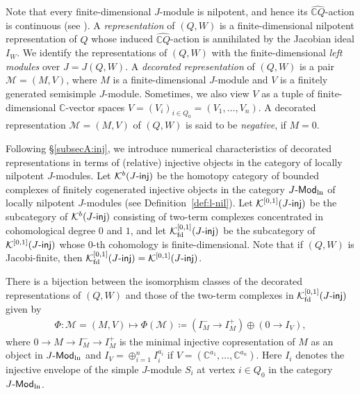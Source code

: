 \documentclass[12pt]{amsart}
\theoremstyle{definition}
\theoremstyle{remark}
\numberwithin{equation}{section}
\newcommand{\Modln}{\mathchar`-\mathsf{Mod}_{\mathrm{ln}}}
\begin{document}
Note that every finite-dimensional $J$-module is
nilpotent, and hence its $\widehat{\mathbb CQ}$-action is continuous
(see \cite[\S 10]{DWZ08}).
A {\em representation} of $(Q,W)$ is a finite-dimensional nilpotent representation of $Q$ whose induced $\widehat{\mathbb CQ}$-action is annihilated by the Jacobian ideal $I_W$. We identify the representations of $(Q,W)$ with the finite-dimensional {\em left modules} over $J=J(Q,W)$. 
A {\em decorated representation}
of $(Q,W)$ is a pair $\mathcal M=(M,V)$, where $M$ is a finite-dimensional 
$J$-module and $V$ is a finitely generated semisimple $J$-module. Sometimes, we also view $V$ as a 
tuple of finite-dimensional $\mathbb C$-vector spaces
$V=(V_i)_{i\in Q_0}=(V_1,\ldots,V_n)$. A decorated representation $\mathcal M=(M,V)$ of $(Q,W)$ is said to be {\em negative}, if $M=0$. 



    Following \S \ref{subsecA:inj}, we introduce numerical characteristics of decorated representations in terms of (relative) injective objects in the category of locally nilpotent $J$-modules.
Let $\mathcal{K}^b(J\mathchar`-\mathsf{inj})$ be the homotopy category of bounded complexes of finitely cogenerated injective objects in the category $J\Modln$ of locally nilpotent $J$-modules (see Definition~\ref{def:l-nil}). Let $\mathcal{K}^{[0,1]}(J\mathchar`-\mathsf{inj})$ be the subcategory of $\mathcal{K}^b(J\mathchar`-\mathsf{inj})$ consisting of two-term complexes concentrated in cohomological degree $0$ and $1$, and let $\mathcal{K}_{\rm fd}^{[0,1]}(J\mathchar`-\mathsf{inj})$ be the subcategory of $\mathcal{K}^{[0,1]}(J\mathchar`-\mathsf{inj})$ whose $0$-th cohomology is finite-dimensional. Note that if $(Q,W)$ is Jacobi-finite, then $\mathcal{K}_{\rm fd}^{[0,1]}(J\mathchar`-\mathsf{inj})=\mathcal{K}^{[0,1]}(J\mathchar`-\mathsf{inj})$.


There is a bijection between the isomorphism classes of the decorated representations of $(Q,W)$ and those of the two-term complexes in $\mathcal{K}_{\rm fd}^{[0,1]}(J\mathchar`-\mathsf{inj})$ given by
\begin{eqnarray}\label{eqn:s-t-bijection}
    \Phi\colon \mathcal M=(M,V)\mapsto  \Phi(\mathcal M)\coloneqq (I_M^{-}{\to}I_M^+)\oplus (0\to I_V),
\end{eqnarray}
where $0\to M\to I_M^-{\to} I_M^+$ is the minimal injective copresentation of $M$ as an object in $J\Modln$ and $I_V=\oplus_{i=1}^nI_i^{a_i}$ if $V=(\mathbb C^{a_1},\ldots,\mathbb C^{a_n})$. Here $I_i$ denotes the injective envelope of the simple $J$-module $S_i$ at vertex $i\in Q_0$ in the category $J\Modln$.
\end{document}
